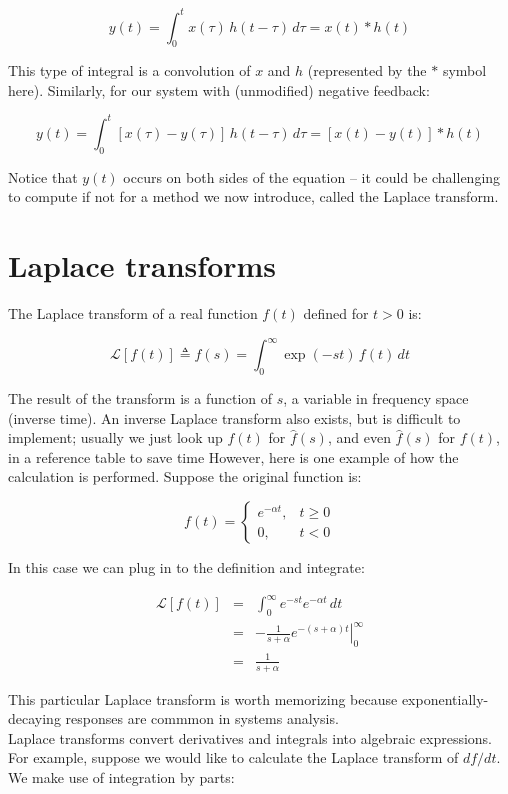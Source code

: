 \documentclass{article}
\newcommand{\Lapl}{\mathscr{L}}
\begin{document}
\[ y(t) = \int_0^t x(\tau) \, h(t - \tau) \, d\tau  = x(t) \ast h(t) \]

This type of integral is a convolution of $x$ and $h$ (represented by the $\ast$ symbol here). Similarly, for our system with (unmodified) negative feedback:

\[ y(t) = \int_0^t \left[ x(\tau) - y(\tau) \right] \, h(t - \tau) \, d\tau  = \left[ x(t) - y(t) \right] \ast h(t) \]

Notice that $y(t)$ occurs on both sides of the equation -- it could be challenging to compute if not for a method we now introduce, called the Laplace transform.

\section*{Laplace transforms}

The Laplace transform of a real function $f(t)$ defined for $t > 0$ is:

\[ \Lapl \left[ f(t) \right] \triangleq \hat{f}(s) = \int_0^{\infty} \exp \left(-st \right) \, f(t) \, dt\]

The result of the transform is a function of $s$, a variable in frequency space (inverse time).  An inverse Laplace transform also exists, but is difficult to implement; usually we just look up $f(t)$ for $\hat{f}(s)$, and even $\hat{f}(s)$ for $f(t)$, in a reference table to save time However, here is one example of how the calculation is performed. Suppose the original function is:

\[  f(t)=\begin{cases}
    e^{- \alpha t}, & t \geq 0\\
    0, & t < 0
  \end{cases} \]

In this case we can plug in to the definition and integrate:

\begin{eqnarray*}
\Lapl \left[ f(t) \right]  & = & \int_0^{\infty} e^{-s t} e^{- \alpha t}\, dt\\
& = & - \frac{1}{s + \alpha} \left.  e^{-(s + \alpha)t} \right|_0^{\infty}\\
& = &  \frac{1}{s + \alpha}
\end{eqnarray*}

This particular Laplace transform is worth memorizing because exponentially-decaying responses are commmon in systems analysis.\\

Laplace transforms convert derivatives and integrals into algebraic expressions. For example, suppose we would like to calculate the Laplace transform of $df/dt$. We make use of integration by parts:
\end{document}
